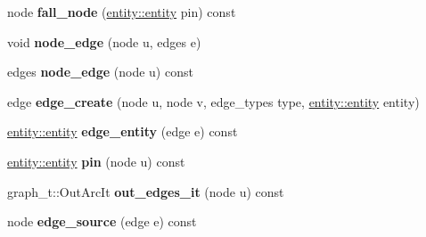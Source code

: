 \begin{DoxyCompactItemize}
\item 
\hypertarget{classophidian_1_1timing_1_1graph_a75f5a686193ce9e70c088e5fabcf1ebf}{node {\bfseries fall\-\_\-node} (\hyperlink{classophidian_1_1entity_1_1entity}{entity\-::entity} pin) const }\label{classophidian_1_1timing_1_1graph_a75f5a686193ce9e70c088e5fabcf1ebf}

\item 
\hypertarget{classophidian_1_1timing_1_1graph_adb6649886b1534f8f37da853146d9dcc}{void {\bfseries node\-\_\-edge} (node u, edges e)}\label{classophidian_1_1timing_1_1graph_adb6649886b1534f8f37da853146d9dcc}

\item 
\hypertarget{classophidian_1_1timing_1_1graph_a54fece1d8df17f0f6495728b18c7cc95}{edges {\bfseries node\-\_\-edge} (node u) const }\label{classophidian_1_1timing_1_1graph_a54fece1d8df17f0f6495728b18c7cc95}

\item 
\hypertarget{classophidian_1_1timing_1_1graph_aedecda957d1fdf00de3210ff5872f82d}{edge {\bfseries edge\-\_\-create} (node u, node v, edge\-\_\-types type, \hyperlink{classophidian_1_1entity_1_1entity}{entity\-::entity} entity)}\label{classophidian_1_1timing_1_1graph_aedecda957d1fdf00de3210ff5872f82d}

\item 
\hypertarget{classophidian_1_1timing_1_1graph_a7a341eca273387f73ad62ef471990920}{\hyperlink{classophidian_1_1entity_1_1entity}{entity\-::entity} {\bfseries edge\-\_\-entity} (edge e) const }\label{classophidian_1_1timing_1_1graph_a7a341eca273387f73ad62ef471990920}

\item 
\hypertarget{classophidian_1_1timing_1_1graph_a84eab056bd68c07d210a85b05b01dbdd}{\hyperlink{classophidian_1_1entity_1_1entity}{entity\-::entity} {\bfseries pin} (node u) const }\label{classophidian_1_1timing_1_1graph_a84eab056bd68c07d210a85b05b01dbdd}

\item 
\hypertarget{classophidian_1_1timing_1_1graph_a6846d4dab8ed6f26c3ac47375c30aaf8}{graph\-\_\-t\-::\-Out\-Arc\-It {\bfseries out\-\_\-edges\-\_\-it} (node u) const }\label{classophidian_1_1timing_1_1graph_a6846d4dab8ed6f26c3ac47375c30aaf8}

\item 
\hypertarget{classophidian_1_1timing_1_1graph_a2c64a71a3747ea6fceb44eb96eb4f250}{node {\bfseries edge\-\_\-source} (edge e) const }\label{classophidian_1_1timing_1_1graph_a2c64a71a3747ea6fceb44eb96eb4f250}


\end{DoxyCompactItemize}
